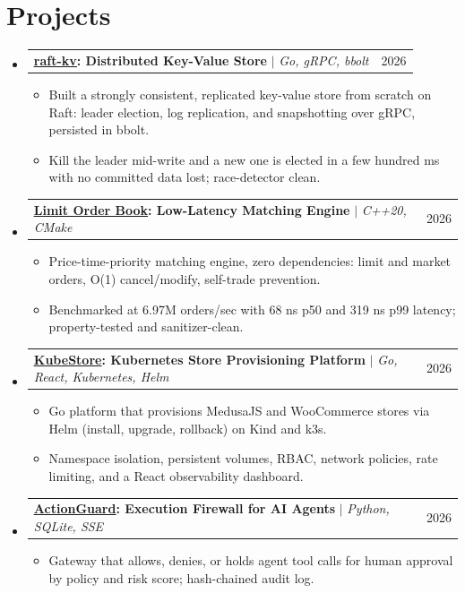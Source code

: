 \documentclass[a4paper,10pt]{article}
\makeatletter
\newcommand{\project}[3]{%
  \item\begin{tabular*}{0.98\textwidth}[t]{l@{\extracolsep{\fill}}r}
    \textbf{#1} $|$ \textit{\small #2} & \small #3 \\
  \end{tabular*}\vspace{-6pt}}
\newcommand{\gh}[1]{\href{https://github.com/0PrashantYadav0/#1}}
\newenvironment{entries}{\begin{itemize}[leftmargin=0.12in,label={},itemsep=1pt,topsep=1pt]}{\end{itemize}}
\newenvironment{points}{\begin{itemize}[leftmargin=0.2in,itemsep=0pt,topsep=1pt,parsep=0pt,label={\tiny$\bullet$}]\small}{\end{itemize}\vspace{-3pt}}
\makeatother
\begin{document}
\section{Projects}
\begin{entries}
  \project{\gh{raft-kv}{\underline{raft-kv}}: Distributed Key-Value Store}{Go, gRPC, bbolt}{2026}
  \begin{points}
    \item Built a strongly consistent, replicated key-value store from scratch on Raft: leader election, log replication, and snapshotting over gRPC, persisted in bbolt.
    \item Kill the leader mid-write and a new one is elected in a few hundred ms with no committed data lost; race-detector clean.
  \end{points}

  \project{\gh{limit-order-book}{\underline{Limit Order Book}}: Low-Latency Matching Engine}{C++20, CMake}{2026}
  \begin{points}
    \item Price-time-priority matching engine, zero dependencies: limit and market orders, O(1) cancel/modify, self-trade prevention.
    \item Benchmarked at 6.97M orders/sec with 68 ns p50 and 319 ns p99 latency; property-tested and sanitizer-clean.
  \end{points}

  \project{\gh{KubeStore}{\underline{KubeStore}}: Kubernetes Store Provisioning Platform}{Go, React, Kubernetes, Helm}{2026}
  \begin{points}
    \item Go platform that provisions MedusaJS and WooCommerce stores via Helm (install, upgrade, rollback) on Kind and k3s.
    \item Namespace isolation, persistent volumes, RBAC, network policies, rate limiting, and a React observability dashboard.
  \end{points}

  \project{\gh{ActionGuard}{\underline{ActionGuard}}: Execution Firewall for AI Agents}{Python, SQLite, SSE}{2026}
  \begin{points}
    \item Gateway that allows, denies, or holds agent tool calls for human approval by policy and risk score; hash-chained audit log.
  \end{points}
\end{entries}

\end{document}
